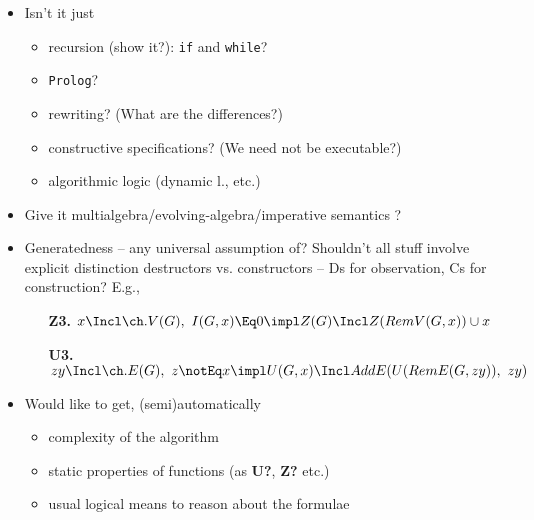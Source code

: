 \documentclass[leqno]{article}
\begin{document}
\begin{itemize}\MyLPar
\item Isn't it just 
 \begin{itemize}\MyLPar
 \item recursion (show it?): {\tt if} and {\tt while}?
 \item {\tt Prolog}?
 \item rewriting? (What are the differences?)
 \item constructive specifications? (We need not be executable?)
 \item algorithmic logic (dynamic l., etc.)
 \end{itemize}
\item Give it multialgebra/evolving-algebra/imperative semantics ?
\item Generatedness -- any universal assumption of? Shouldn't all stuff involve explicit
distinction destructors vs. constructors -- Ds for observation, Cs for construction? 
E.g., \begin{itemize}
\item[{\bf Z3.}] $x\Incl \ch.V(G),\ I(G,x)\Eq 0\impl Z(G)\Incl Z(RemV(G,x))\cup x$
\item[{\bf U3.}] $ zy\Incl \ch.E(G),\ z\notEq x\impl U(G,x)\Incl 
   AddE(U(RemE(G, zy)),\  zy)$
  \end{itemize}
\item Would like to get, (semi)automatically
 \begin{itemize}\MyLPar
 \item complexity of the algorithm
 \item static properties of functions (as {\bf U?}, {\bf Z?} etc.)
 \item usual logical means to reason about the formulae
 \end{itemize}
\end{itemize}
\end{document}
